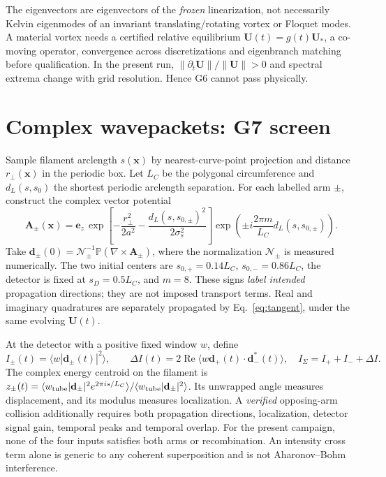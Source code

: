 \documentclass[11pt,a4paper]{article}
\begin{document}
The eigenvectors are eigenvectors of the \emph{frozen} linearization, not necessarily Kelvin eigenmodes of an invariant translating/rotating vortex or Floquet modes. A material vortex needs a certified relative equilibrium $\mathbf U(t)=g(t)\mathbf U_*$, a co-moving operator, convergence across discretizations and eigenbranch matching before qualification. In the present run, $\|\partial_t\mathbf U\|/\|\mathbf U\|>0$ and spectral extrema change with grid resolution. Hence G6 cannot pass physically.
\section{Complex wavepackets: G7 screen}
Sample filament arclength $s(\mathbf x)$ by nearest-curve-point projection and distance $r_\perp(\mathbf x)$ in the periodic box. Let $L_C$ be the polygonal circumference and $d_L(s,s_0)$ the shortest periodic arclength separation. For each labelled arm $\pm$, construct the complex vector potential
\begin{equation}
\mathbf A_\pm(\mathbf x)=\mathbf e_z\,\exp\left[-\frac{r_\perp^2}{2a^2}-\frac{d_L(s,s_{0,\pm})^2}{2\sigma_s^2}\right]\exp\left(\pm i\frac{2\pi m}{L_C}d_L(s,s_{0,\pm})\right).
\end{equation}
Take $\mathbf d_\pm(0)=\mathcal N_\pm^{-1}\mathbb P(\nabla\times\mathbf A_\pm)$, where the normalization $\mathcal N_\pm$ is measured numerically. The two initial centers are $s_{0,+}=0.14L_C$, $s_{0,-}=0.86L_C$, the detector is fixed at $s_D=0.5L_C$, and $m=8$. These signs \emph{label intended} propagation directions; they are not imposed transport terms. Real and imaginary quadratures are separately propagated by Eq.~\eqref{eq:tangent}, under the same evolving $\mathbf U(t)$.

At the detector with a positive fixed window $w$, define
\begin{equation}
I_\pm(t)=\langle w|\mathbf d_\pm(t)|^2\rangle,\qquad
\Delta I(t)=2\operatorname{Re}\langle w\mathbf d_+(t)\cdot\mathbf d_-^*(t)\rangle,
\quad I_\Sigma=I_++I_-+\Delta I.
\end{equation}
The complex energy centroid on the filament is $z_\pm(t)=\langle w_{\rm tube}|\mathbf d_\pm|^2 e^{2\pi is/L_C}\rangle/\langle w_{\rm tube}|\mathbf d_\pm|^2\rangle$. Its unwrapped angle measures displacement, and its modulus measures localization. A \emph{verified} opposing-arm collision additionally requires both propagation directions, localization, detector signal gain, temporal peaks and temporal overlap. For the present campaign, none of the four inputs satisfies both arms or recombination. An intensity cross term alone is generic to any coherent superposition and is not Aharonov--Bohm interference.
\end{document}
